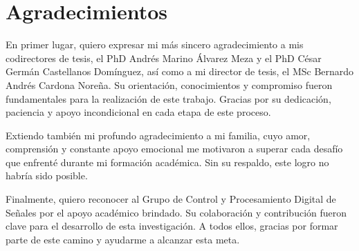 \chapter*{\sffamily Agradecimientos}


En primer lugar, quiero expresar mi más sincero agradecimiento a mis codirectores de tesis, el PhD Andrés Marino Álvarez Meza y el PhD César Germán Castellanos Domínguez, así como a mi director de tesis, el MSc Bernardo Andrés Cardona Noreña. Su orientación, conocimientos y compromiso fueron fundamentales para la realización de este trabajo. Gracias por su dedicación, paciencia y apoyo incondicional en cada etapa de este proceso.

Extiendo también mi profundo agradecimiento a mi familia, cuyo amor, comprensión y constante apoyo emocional me motivaron a superar cada desafío que enfrenté durante mi formación académica. Sin su respaldo, este logro no habría sido posible.

Finalmente, quiero reconocer al Grupo de Control y Procesamiento Digital de Señales por el apoyo académico brindado. Su colaboración y contribución fueron clave para el desarrollo de esta investigación. A todos ellos, gracias por formar parte de este camino y ayudarme a alcanzar esta meta.




\begin{flushright}
\studentname\\
\issuedate
\end{flushright}